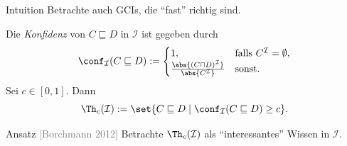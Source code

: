 \documentclass[ngerman]{beamer}
\newcommand{\pseudocite}[1]{\textcolor{gray}{[#1]}}
\begin{document}
\begin{frame}

  \onslide<+->

  \begin{block}{Intuition}
    Betrachte auch GCIs, die \enquote{fast} richtig sind.
  \end{block}

  \onslide<+->
  \begin{Definition}
    Die \emph{Konfidenz} von $C \sqsubseteq D$ in $\mathcal{I}$ ist gegeben durch
    \begin{equation*}
      \conf_{\mathcal{I}}(C \sqsubseteq D) :=
      \begin{cases}
        1, & \text{falls } C^{\mathcal{I}} = \emptyset,\\
        \frac{\abs{(C \sqcap D)^{\mathcal{I}}}}{\abs{C^{\mathcal{I}}}} & \text{sonst}.
      \end{cases}
    \end{equation*}
    \onslide<+->%
    Sei $c \in [0, 1]$.  Dann
    \begin{equation*}
      \Th_c(\mathcal{I}) := \set{ C \sqsubseteq D \mid \conf_{\mathcal{I}}(C \sqsubseteq
        D) \ge c}.
    \end{equation*}
  \end{Definition}

  \onslide<+->

  \begin{block}{Ansatz \pseudocite{Borchmann 2012}}
    Betrachte $\Th_{c}(\mathcal{I})$ als \enquote{interessantes} Wissen in $\mathcal{I}$.
  \end{block}

\end{frame}
\end{document}
